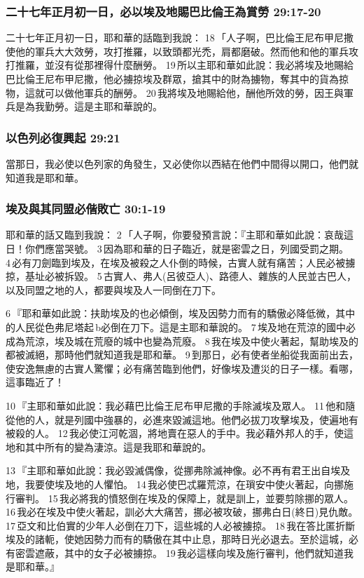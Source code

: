 \subsubsection{二十七年正月初一日，必以埃及地賜巴比倫王為賞勞 29:17-20}
二十七年正月初一日，耶和華的話臨到我說： 18 「人子啊，巴比倫王尼布甲尼撒使他的軍兵大大效勞，攻打推羅，以致頭都光禿，肩都磨破。然而他和他的軍兵攻打推羅，並沒有從那裡得什麼酬勞。 19 所以主耶和華如此說：我必將埃及地賜給巴比倫王尼布甲尼撒，他必擄掠埃及群眾，搶其中的財為擄物，奪其中的貨為掠物，這就可以做他軍兵的酬勞。 20 我將埃及地賜給他，酬他所效的勞，因王與軍兵是為我勤勞。這是主耶和華說的。

\subsubsection{以色列必復興起 29:21}
當那日，我必使以色列家的角發生，又必使你以西結在他們中間得以開口，他們就知道我是耶和華。


\subsubsection{埃及與其同盟必偕敗亡 30:1-19}
耶和華的話又臨到我說： 2 「人子啊，你要發預言說：『主耶和華如此說：哀哉這日！你們應當哭號。 3 因為耶和華的日子臨近，就是密雲之日，列國受罰之期。 4 必有刀劍臨到埃及，在埃及被殺之人仆倒的時候，古實人就有痛苦；人民必被擄掠，基址必被拆毀。 5 古實人、弗人(呂彼亞人)、路德人、雜族的人民並古巴人，以及同盟之地的人，都要與埃及人一同倒在刀下。

6 『耶和華如此說：扶助埃及的也必傾倒，埃及因勢力而有的驕傲必降低微，其中的人民從色弗尼塔起 b必倒在刀下。這是主耶和華說的。 7 埃及地在荒涼的國中必成為荒涼，埃及城在荒廢的城中也變為荒廢。 8 我在埃及中使火著起，幫助埃及的都被滅絕，那時他們就知道我是耶和華。 9 到那日，必有使者坐船從我面前出去，使安逸無慮的古實人驚懼；必有痛苦臨到他們，好像埃及遭災的日子一樣。看哪，這事臨近了！

10 『主耶和華如此說：我必藉巴比倫王尼布甲尼撒的手除滅埃及眾人。 11 他和隨從他的人，就是列國中強暴的，必進來毀滅這地。他們必拔刀攻擊埃及，使遍地有被殺的人。 12 我必使江河乾涸，將地賣在惡人的手中。我必藉外邦人的手，使這地和其中所有的變為淒涼。這是我耶和華說的。

13 『主耶和華如此說：我必毀滅偶像，從挪弗除滅神像。必不再有君王出自埃及地，我要使埃及地的人懼怕。 14 我必使巴忒羅荒涼，在瑣安中使火著起，向挪施行審判。 15 我必將我的憤怒倒在埃及的保障上，就是訓上，並要剪除挪的眾人。 16 我必在埃及中使火著起，訓必大大痛苦，挪必被攻破，挪弗白日(終日)見仇敵。 17 亞文和比伯實的少年人必倒在刀下，這些城的人必被擄掠。 18 我在答比匿折斷埃及的諸軛，使她因勢力而有的驕傲在其中止息，那時日光必退去。至於這城，必有密雲遮蔽，其中的女子必被擄掠。 19 我必這樣向埃及施行審判，他們就知道我是耶和華。』

